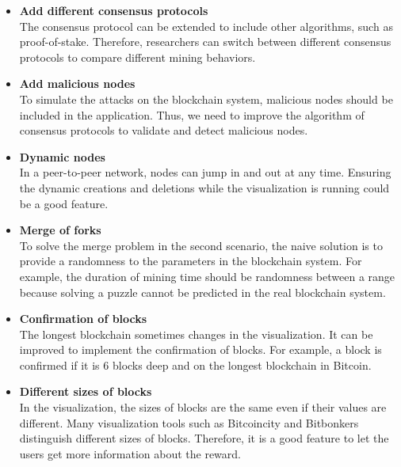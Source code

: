 \begin{itemize}
    \item \textbf{Add different consensus protocols} \\
        The consensus protocol can be extended to include other algorithms, such as proof-of-stake. Therefore, researchers can switch between different consensus protocols to compare different mining behaviors.
    \item \textbf{Add malicious nodes} \\
        To simulate the attacks on the blockchain system, malicious nodes should be included in the application. Thus, we need to improve the algorithm of consensus protocols to validate and detect malicious nodes.
    \item \textbf{Dynamic nodes} \\
        In a peer-to-peer network, nodes can jump in and out at any time. Ensuring the dynamic creations and deletions while the visualization is running could be a good feature.
    \item \textbf{Merge of forks} \\
        To solve the merge problem in the second scenario, the naive solution is to provide a randomness to the parameters in the blockchain system. For example, the duration of mining time should be randomness between a range because solving a puzzle cannot be predicted in the real blockchain system.
    \item \textbf{Confirmation of blocks} \\
        The longest blockchain sometimes changes in the visualization. It can be improved to implement the confirmation of blocks. For example, a block is confirmed if it is 6 blocks deep and on the longest blockchain in Bitcoin.
    \item \textbf{Different sizes of blocks} \\
        In the visualization, the sizes of blocks are the same even if their values are different. Many visualization tools such as Bitcoincity and Bitbonkers distinguish different sizes of blocks. Therefore, it is a good feature to let the users get more information about the reward.
\end{itemize}
